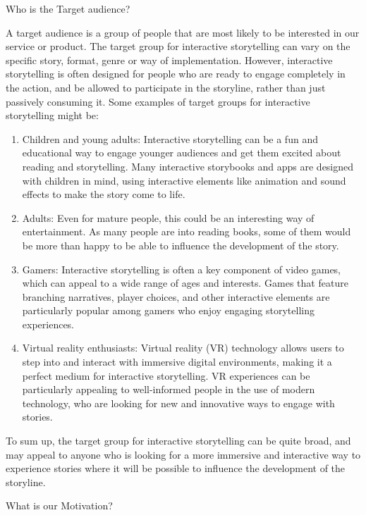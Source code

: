 \noindent Who is the Target audience?

A target audience is a group of people that are most likely to be interested in our service or product. The target group for interactive storytelling can vary on the specific story, format, genre or way of implementation. However, interactive storytelling is often designed for people who are ready to engage completely in the action, and be allowed to participate in the storyline, rather than just passively consuming it.
Some examples of target groups for interactive storytelling might be:

 \begin{enumerate}
                 \item Children and young adults: Interactive storytelling can be a fun and educational way to engage younger audiences and get them excited about reading and storytelling. Many interactive storybooks and apps are designed with children in mind, using interactive elements like animation and sound effects to make the story come to life.
                 \item Adults: Even for mature people, this could be an interesting way of entertainment. As many people are into reading books, some of them would be more than happy to be able to influence the development of the story.
                 \item Gamers: Interactive storytelling is often a key component of video games, which can appeal to a wide range of ages and interests. Games that feature branching narratives, player choices, and other interactive elements are particularly popular among gamers who enjoy engaging storytelling experiences.
                 \item Virtual reality enthusiasts: Virtual reality (VR) technology allows users to step into and interact with immersive digital environments, making it a perfect medium for interactive storytelling. VR experiences can be particularly appealing to well-informed people in the use of modern technology, who are looking for new and innovative ways to engage with stories.
 \end{enumerate}

 To sum up, the target group for interactive storytelling can be quite broad, and may appeal to anyone who is looking for a more immersive and interactive way to experience stories where it will be possible to influence the development of the storyline.

\noindent What is our Motivation?
 
